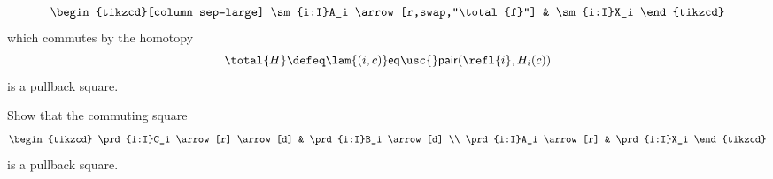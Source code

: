 \begin{exercises}
\begin{subexenum}
\begin{equation*}
\begin{tikzcd}[column sep=large]
\sm{i:I}A_i \arrow[r,swap,"\total{f}"] & \sm{i:I}X_i
\end{tikzcd}
\end{equation*}
which commutes by the homotopy
\begin{equation*}
\total{H}\defeq \lam{(i,c)}\mathsf{eq\usc{}pair}(\refl{i},H_i(c))
\end{equation*}
is a pullback square.
\item Show that the commuting square
\begin{equation*}
\begin{tikzcd}
\prd{i:I}C_i \arrow[r] \arrow[d] & \prd{i:I}B_i \arrow[d] \\
\prd{i:I}A_i \arrow[r] & \prd{i:I}X_i
\end{tikzcd}
\end{equation*}
is a pullback square.
\end{subexenum}

\end{exercises}
